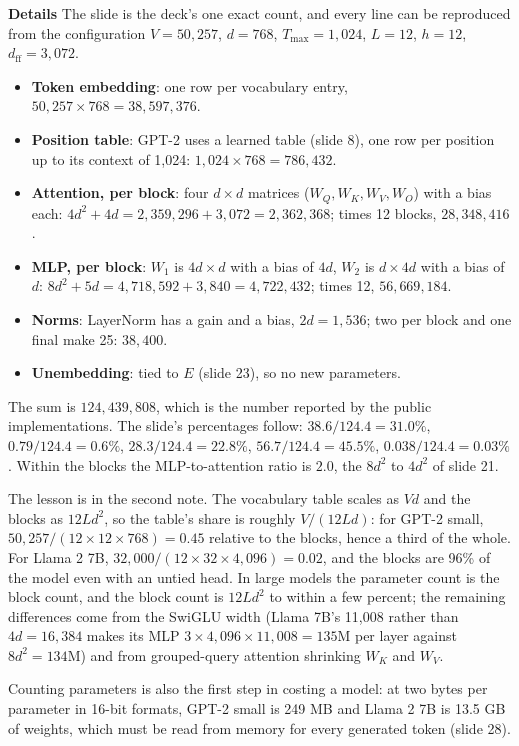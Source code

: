 \documentclass[11pt,letterpaper]{article}
\newcommand{\para}[1]{\medskip\noindent\textbf{#1}\quad}
\newcommand{\dff}{d_{\mathrm{ff}}}
\newcommand{\Tmax}{T_{\max}}
\begin{document}
\para{Details} The slide is the deck's one exact count, and every line can be reproduced from the configuration $V=50{,}257$, $d=768$, $\Tmax=1{,}024$, $L=12$, $h=12$, $\dff=3{,}072$.
\begin{itemize}
\item \textbf{Token embedding}: one row per vocabulary entry, $50{,}257\times768=38{,}597{,}376$.
\item \textbf{Position table}: GPT-2 uses a learned table (slide 8), one row per position up to its context of 1,024: $1{,}024\times768=786{,}432$.
\item \textbf{Attention, per block}: four $d\times d$ matrices ($W_Q,W_K,W_V,W_O$) with a bias each: $4d^2+4d=2{,}359{,}296+3{,}072=2{,}362{,}368$; times 12 blocks, $28{,}348{,}416$.
\item \textbf{MLP, per block}: $W_1$ is $4d\times d$ with a bias of $4d$, $W_2$ is $d\times4d$ with a bias of $d$: $8d^2+5d=4{,}718{,}592+3{,}840=4{,}722{,}432$; times 12, $56{,}669{,}184$.
\item \textbf{Norms}: LayerNorm has a gain and a bias, $2d=1{,}536$; two per block and one final make 25: $38{,}400$.
\item \textbf{Unembedding}: tied to $E$ (slide 23), so no new parameters.
\end{itemize}
The sum is $124{,}439{,}808$, which is the number reported by the public implementations. The slide's percentages follow: $38.6/124.4=31.0\%$, $0.79/124.4=0.6\%$, $28.3/124.4=22.8\%$, $56.7/124.4=45.5\%$, $0.038/124.4=0.03\%$. Within the blocks the MLP-to-attention ratio is $2.0$, the $8d^2$ to $4d^2$ of slide 21.

The lesson is in the second note. The vocabulary table scales as $Vd$ and the blocks as $12Ld^2$, so the table's share is roughly $V/(12Ld)$: for GPT-2 small, $50{,}257/(12\times12\times768)=0.45$ relative to the blocks, hence a third of the whole. For Llama 2 7B, $32{,}000/(12\times32\times4{,}096)=0.02$, and the blocks are 96\% of the model even with an untied head. In large models the parameter count is the block count, and the block count is $12Ld^2$ to within a few percent; the remaining differences come from the SwiGLU width (Llama 7B's 11,008 rather than $4d=16{,}384$ makes its MLP $3\times4{,}096\times11{,}008=135$M per layer against $8d^2=134$M) and from grouped-query attention shrinking $W_K$ and $W_V$.

Counting parameters is also the first step in costing a model: at two bytes per parameter in 16-bit formats, GPT-2 small is 249 MB and Llama 2 7B is 13.5 GB of weights, which must be read from memory for every generated token (slide 28).
\end{document}
